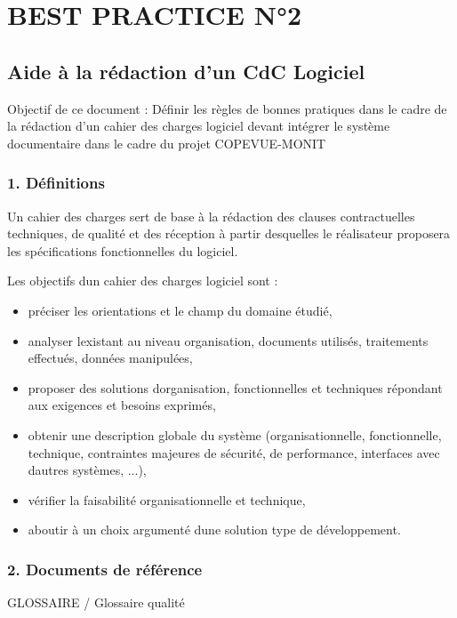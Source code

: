 \documentclass{article}
\title{}
\author{}
\date{}
\begin{document}
\section{BEST PRACTICE N°2}
\subsection{Aide à la rédaction d’un CdC Logiciel}

\bigskip


\bigskip

Objectif de ce document : Définir les règles de bonnes pratiques dans le
cadre de la rédaction d’un cahier des charges logiciel  devant intégrer
le système documentaire dans le cadre du projet COPEVUE-MONIT


\bigskip

\subsubsection[1. Définitions]{1. Définitions}
Un cahier des charges sert de base à la rédaction des clauses
contractuelles techniques, de qualité et des réception à partir
desquelles le réalisateur proposera les spécifications fonctionnelles
du logiciel.


\bigskip

Les objectifs d{\textquotesingle}un cahier des charges logiciel sont :

\begin{itemize}
\item préciser les orientations et le champ du domaine étudié,
\item analyser l{\textquotesingle}existant au niveau organisation,
documents utilisés, traitements effectués, données manipulées,
\item proposer des solutions d{\textquotesingle}organisation,
fonctionnelles et techniques répondant aux exigences et besoins
exprimés,
\item obtenir une description globale du système (organisationnelle,
fonctionnelle, technique, contraintes majeures de sécurité, de
performance, interfaces avec d{\textquotesingle}autres systèmes, ...),
\item vérifier la faisabilité organisationnelle et technique,
\item aboutir à un choix argumenté d{\textquotesingle}une solution type
de développement.
\end{itemize}

\bigskip

\subsubsection[2. Documents de référence]{2. Documents de référence}
GLOSSAIRE / Glossaire qualité
\end{document}
